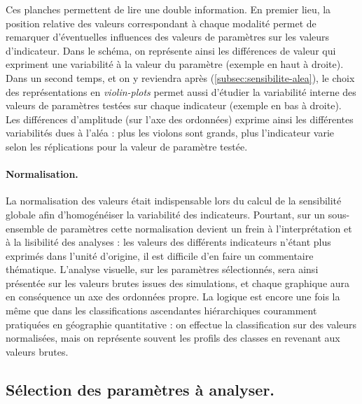 Ces planches permettent de lire une double information.
En premier lieu, la position relative des valeurs correspondant à chaque modalité permet de remarquer d'éventuelles influences des valeurs de paramètres sur les valeurs d'indicateur.
Dans le schéma, on représente ainsi les \og différences de valeur\fg{} qui expriment une variabilité à la valeur du paramètre (exemple en haut à droite).
Dans un second temps, et on y reviendra après (\cref{subsec:sensibilite-alea}), le choix des représentations en \textit{violin-plots} permet aussi d'étudier la variabilité interne des valeurs de paramètres testées sur chaque indicateur (exemple en bas à droite).
Les différences d'amplitude (sur l'axe des ordonnées) exprime ainsi les différentes variabilités dues à l'aléa : plus les \og violons\fg{} sont grands, plus l'indicateur varie selon les réplications pour la valeur de paramètre testée.

\paragraph{Normalisation.}
La normalisation des valeurs était indispensable lors du calcul de la sensibilité globale afin d'homogénéiser la variabilité des indicateurs.
Pourtant, sur un sous-ensemble de paramètres cette normalisation devient un frein à l'interprétation et à la lisibilité des analyses : les valeurs des différents indicateurs n'étant plus exprimés dans l'unité d'origine, il est difficile d'en faire un commentaire thématique.
L'analyse visuelle, sur les paramètres sélectionnés, sera ainsi présentée sur les valeurs brutes issues des simulations, et chaque graphique aura en conséquence un axe des ordonnées propre.
La logique est encore une fois la même que dans les classifications ascendantes hiérarchiques couramment pratiquées en géographie quantitative : on effectue la classification sur des valeurs normalisées, mais on représente souvent les profils des classes en revenant aux valeurs brutes.

\subsection{Sélection des paramètres à analyser.}

